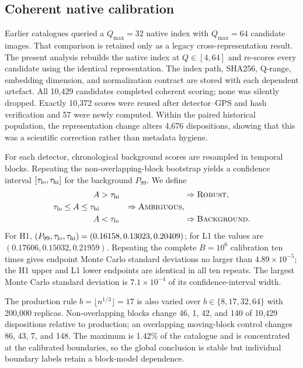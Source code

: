 \documentclass[aps,prd,twocolumn,superscriptaddress,nofootinbib,amsmath,amssymb,floatfix,10pt]{revtex4-2}
\newcommand{\robust}{\textsc{Robust}}
\newcommand{\ambiguous}{\textsc{Ambiguous}}
\newcommand{\background}{\textsc{Background}}
\begin{document}
\subsection{Coherent native calibration}

Earlier catalogues queried a $Q_{\max}=32$ native index with
$Q_{\max}=64$ candidate images.  That comparison is retained only as a legacy
cross-representation result.  The present analysis rebuilds the native index
at $Q\in[4,64]$ and re-scores every candidate using the identical
representation.  The index path, SHA256, Q-range, embedding dimension, and
normalization contract are stored with each dependent artefact.  All 10,429
candidates completed coherent scoring; none was silently dropped. Exactly
10,372 scores were reused after detector--GPS and hash verification and 57
were newly computed. Within the paired historical population, the
representation change alters 4,676 dispositions, showing that this was a
scientific correction rather than metadata hygiene.

For each detector, chronological background scores are resampled in temporal
blocks.  Repeating the non-overlapping-block bootstrap yields a confidence interval
$[\tau_{\rm lo},\tau_{\rm hi}]$ for the background $P_{99}$.  We define
\begin{align}
 A &> \tau_{\rm hi} &&\Rightarrow \robust,\\
 \tau_{\rm lo}\le A\le\tau_{\rm hi} &&\Rightarrow \ambiguous,\\
 A &< \tau_{\rm lo} &&\Rightarrow \background.
\end{align}
For H1, $(P_{99},\tau_{\rm lo},\tau_{\rm hi})
=(0.16158,0.13023,0.20409)$; for L1 the values are
$(0.17606,0.15032,0.21959)$.  Repeating the complete $B=10^6$ calibration ten
times gives endpoint Monte Carlo standard deviations no larger than
$4.89\times10^{-5}$; the H1 upper and L1 lower endpoints are identical in all
ten repeats.  The largest Monte Carlo standard deviation is
$7.1\times10^{-4}$ of its confidence-interval width.

The production rule $b=\lfloor n^{1/3}\rfloor=17$ is also varied over
$b\in\{8,17,32,64\}$ with 200,000 replicas.  Non-overlapping blocks change
46, 1, 42, and 140 of 10,429 dispositions relative to production; an
overlapping moving-block control changes 86, 43, 7, and 148.  The maximum is
1.42\% of the catalogue and is concentrated at the calibrated boundaries, so
the global conclusion is stable but individual boundary labels retain a
block-model dependence.
\end{document}
